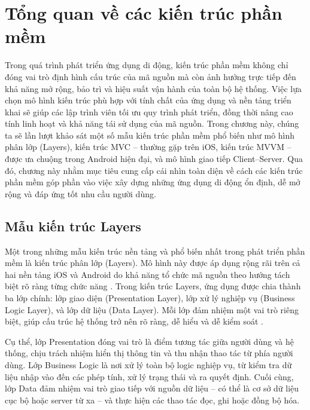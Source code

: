 \section{Tổng quan về các kiến trúc phần mềm}

\begin{flushleft}
  \hspace*{0.8cm}Trong quá trình phát triển ứng dụng di động, kiến trúc phần mềm không chỉ đóng vai trò định hình cấu trúc của mã nguồn mà còn ảnh hưởng trực tiếp đến khả năng mở rộng, bảo trì và hiệu suất vận hành của toàn bộ hệ thống. Việc lựa chọn mô hình kiến trúc phù hợp với tính chất của ứng dụng và nền tảng triển khai sẽ giúp các lập trình viên tối ưu quy trình phát triển, đồng thời nâng cao tính linh hoạt và khả năng tái sử dụng của mã nguồn. Trong chương này, chúng ta sẽ lần lượt khảo sát một số mẫu kiến trúc phần mềm phổ biến như mô hình phân lớp (Layers), kiến trúc MVC – thường gặp trên iOS, kiến trúc MVVM – được ưa chuộng trong Android hiện đại, và mô hình giao tiếp Client–Server. Qua đó, chương này nhằm mục tiêu cung cấp cái nhìn toàn diện về cách các kiến trúc phần mềm góp phần vào việc xây dựng những ứng dụng di động ổn định, dễ mở rộng và đáp ứng tốt nhu cầu người dùng.
\end{flushleft}

\subsection{Mẫu kiến trúc Layers}
\renewcommand{\labelitemi}{--}    
\begin{flushleft}
    \hspace*{0.8cm}Một trong những mẫu kiến trúc nền tảng và phổ biến nhất trong phát triển phần mềm là kiến trúc phân lớp (Layers). Mô hình này được áp dụng rộng rãi trên cả hai nền tảng iOS và Android do khả năng tổ chức mã nguồn theo hướng tách biệt rõ ràng từng chức năng \cite{layered_arch}. Trong kiến trúc Layers, ứng dụng được chia thành ba lớp chính: lớp giao diện (Presentation Layer), lớp xử lý nghiệp vụ (Business Logic Layer), và lớp dữ liệu (Data Layer). Mỗi lớp đảm nhiệm một vai trò riêng biệt, giúp cấu trúc hệ thống trở nên rõ ràng, dễ hiểu và dễ kiểm soát \cite{clean_architecture}.
\end{flushleft}
    
    \begin{flushleft}
        \hspace*{0.8cm}Cụ thể, lớp Presentation đóng vai trò là điểm tương tác giữa người dùng và hệ thống, chịu trách nhiệm hiển thị thông tin và thu nhận thao tác từ phía người dùng. Lớp Business Logic là nơi xử lý toàn bộ logic nghiệp vụ, từ kiểm tra dữ liệu nhập vào đến các phép tính, xử lý trạng thái và ra quyết định. Cuối cùng, lớp Data đảm nhiệm vai trò giao tiếp với nguồn dữ liệu – có thể là cơ sở dữ liệu cục bộ hoặc server từ xa – và thực hiện các thao tác đọc, ghi hoặc đồng bộ hóa.
    
    \end{flushleft}
    
